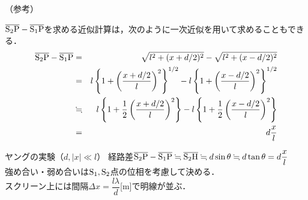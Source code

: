 （参考）\hrulefill 

$ \overline{{\rm S_2P}} -\overline{{\rm S_1P}}$を求める近似計算は，次のように一次近似を用いて求めることもできる．
\begin{eqnarray*}
 \overline{{\rm S_2P}} -\overline{{\rm S_1P}} &=& \sqrt{l^2+(x+d/2)^2}-\sqrt{l^2+(x-d/2)^2}\\
 &=&l\left\{ 1+\left( \dfrac{x+d/2}{l} \right)^2 \right\}^{1/2}-l\left\{ 1+\left( \dfrac{x-d/2}{l} \right)^2 \right\}^{1/2}\\
 &\fallingdotseq& l\left\{ 1+\dfrac{1}{2} \left( \dfrac{x+d/2}{l} \right)^2 \right\}-l\left\{ 1+\dfrac{1}{2} \left( \dfrac{x-d/2}{l} \right)^2 \right\}\\
 &=&d\dfrac{x}{l}
\end{eqnarray*}

\hrulefill


 \begin{matome}{ヤングの実験（$d,|x|\ll l$）}
 \hspace{3mm} 経路差$\overline{{\rm S_2P}} -\overline{{\rm S_1P}}\fallingdotseq \overline{{\rm S_2H}} \fallingdotseq d\sin \theta \fallingdotseq d\tan \theta =d\dfrac{x}{l}$\\
 強め合い・弱め合いは${\rm S_1,S_2}$点の位相を考慮して決める．\\
 スクリーン上には間隔$\Delta x=\dfrac{l\lambda}{d}$[m]で明線が並ぶ．
 \end{matome}

